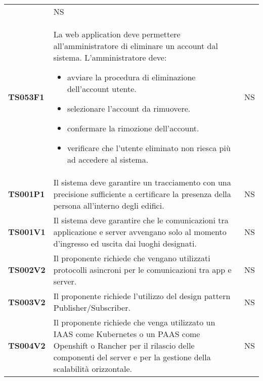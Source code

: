 \documentclass[../piano-di-qualifica.tex]{subfiles}
\begin{document}
\begin{centering}
\begin{longtable}[H]{>{\centering\bfseries}m{3cm} >{}p{10cm} >{\centering\arraybackslash}m{3cm}}
\begin{itemize}
                      \end{itemize}
                    & NS \\
        TS053F1     & La web application deve permettere all'amministratore di eliminare un account dal sistema. \newline
                      L'amministratore deve:
                      \begin{itemize}
                        \item avviare la procedura di eliminazione dell'account utente.
                        \item selezionare l'account da rimuovere.
                        \item confermare la rimozione dell'account.
                        \item verificare che l'utente eliminato non riesca più ad accedere al sistema.
                      \end{itemize}
                    & NS \\


        TS001P1 & Il sistema deve garantire un tracciamento con una precisione sufficiente a certificare la presenza della persona all’interno degli edifici. \newline
                & NS \\

        TS001V1 & Il sistema deve garantire che le comunicazioni tra applicazione e server avvengano solo al momento d’ingresso ed uscita dai luoghi designati. \newline
                & NS \\

        TS002V2 & Il proponente richiede che vengano utilizzati protocolli asincroni per le comunicazioni tra app e server. \newline
                & NS \\

        TS003V2 & Il proponente richiede l’utilizzo del design pattern Publisher/Subscriber. \newline
                & NS \\

        TS004V2 & Il proponente richiede che venga utilizzato un IAAS come Kubernetes o un PAAS come Openshift o Rancher per il rilascio delle componenti del server e per la gestione della scalabilità orizzontale. \newline
                & NS \\


\end{longtable}
\end{centering}
\end{document}
